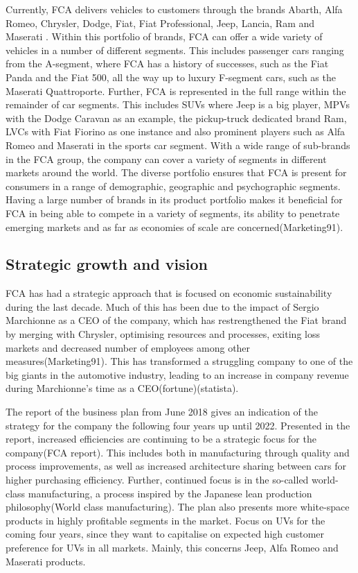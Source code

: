 Currently, FCA delivers vehicles to customers through the brands Abarth, Alfa Romeo, Chrysler, Dodge, Fiat, Fiat Professional, Jeep, Lancia, Ram and Maserati \cite{fca_overview}. Within this portfolio of brands, FCA can offer a wide variety of vehicles in a number of different segments. This includes passenger cars ranging from the A-segment, where FCA has a history of successes, such as the Fiat Panda and the Fiat 500, all the way up to luxury F-segment cars, such as the Maserati Quattroporte. 
Further, FCA is represented in the full range within the remainder of car segments. This includes SUVs where Jeep is a big player, MPVs with the Dodge Caravan as an example, the pickup-truck dedicated brand Ram, LVCs with Fiat Fiorino as one instance and also prominent players such as Alfa Romeo and Maserati in the sports car segment. With a wide range of sub-brands in the FCA group, the company can cover a variety of segments in different markets around the world. The diverse portfolio ensures that FCA is present for consumers in a range of demographic, geographic and psychographic segments. Having a large number of brands in its product portfolio makes it beneficial for FCA in being able to compete in a variety of segments, its ability to penetrate emerging markets and as far as economies of scale are concerned(Marketing91).


\subsection{Strategic growth and vision}
FCA has had a strategic approach that is focused on economic sustainability during the last decade. Much of this has been due to the impact of Sergio Marchionne as a CEO of the company, which has restrengthened the Fiat brand by merging with Chrysler, optimising resources and processes, exiting loss markets and decreased number of employees among other measures(Marketing91). This has transformed a struggling company to one of the big giants in the automotive industry, leading to an increase in company revenue during Marchionne’s time as a CEO(fortune)(statista).

The report of the business plan from June 2018 gives an indication of the strategy for the company the following four years up until 2022. Presented in the report, increased efficiencies are continuing to be a strategic focus for the company(FCA report). This includes both in manufacturing through quality and process improvements, as well as increased architecture sharing between cars for higher purchasing efficiency. Further, continued focus is in the so-called world-class manufacturing, a process inspired by the Japanese lean production philosophy(World class manufacturing). The plan also presents more white-space products in highly profitable segments in the market. Focus on UVs for the coming four years, since they want to capitalise on expected high customer preference for UVs in all markets. Mainly, this concerns Jeep, Alfa Romeo and Maserati products. 

